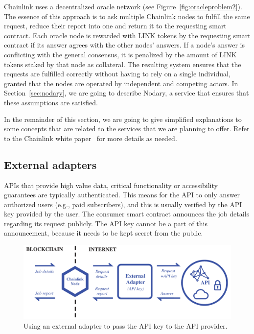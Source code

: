 \documentclass[12pt]{article}
\begin{document}
Chainlink uses a decentralized oracle network (see Figure~\ref{fig:oracleproblem2}).
The essence of this approach is to ask multiple Chainlink nodes to fulfill the same request, reduce their report into one and return it to the requesting smart contract.
Each oracle node is rewarded with LINK tokens by the requesting smart contract if its answer agrees with the other nodes’ answers.
If a node’s answer is conflicting with the general consensus, it is penalized by the amount of LINK tokens staked by that node as collateral.
The resulting system ensures that the requests are fulfilled correctly without having to rely on a single individual, granted that the nodes are operated by independent and competing actors.
In Section~\ref{sec:nodary}, we are going to describe Nodary, a service that ensures that these assumptions are satisfied.

In the remainder of this section, we are going to give simplified explanations to some concepts that are related to the services that we are planning to offer.
Refer to the Chainlink white paper~\cite{Ellis:2017} for more details as needed.

\subsection{External adapters}
\label{sec:externaladapters}

APIs that provide high value data, critical functionality or accessibility guarantees are typically authenticated.
This means for the API to only answer authorized users (e.g., paid subscribers), and this is usually verified by the API key provided by the user.
The consumer smart contract announces the job details regarding its request publicly.
The API key cannot be a part of this announcement, because it needs to be kept secret from the public.

\begin{figure}
	\includegraphics[width=\textwidth]{Figures/externaladapter}
	\caption{Using an external adapter to pass the API key to the API provider.}
	\label{fig:externaladapter}
\end{figure}
\end{document}
